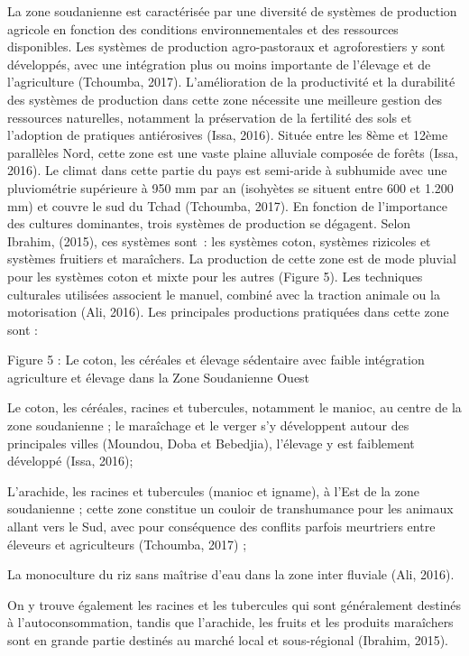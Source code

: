 \documentclass[12pt,oneside]{report}
\begin{document}
La zone soudanienne est caractérisée par une diversité de systèmes de production agricole en fonction des conditions environnementales et des ressources disponibles. Les systèmes de production agro-pastoraux et agroforestiers y sont développés, avec une intégration plus ou moins importante de l'élevage et de l'agriculture (Tchoumba, 2017). L'amélioration de la productivité et la durabilité des systèmes de production dans cette zone nécessite une meilleure gestion des ressources naturelles, notamment la préservation de la fertilité des sols et l'adoption de pratiques antiérosives (Issa, 2016). Située entre les 8ème et 12ème parallèles Nord, cette zone est une vaste plaine alluviale composée de forêts (Issa, 2016). Le climat dans cette partie du pays est semi-aride à subhumide avec une pluviométrie supérieure à 950 mm par an (isohyètes se situent entre 600 et 1.200 mm) et couvre le sud du Tchad (Tchoumba, 2017). En fonction de l’importance des cultures dominantes, trois systèmes de production se dégagent. Selon Ibrahim, (2015), ces systèmes sont : les systèmes coton, systèmes rizicoles et systèmes fruitiers et maraîchers. La production de cette zone est de mode pluvial pour les systèmes coton et mixte pour les autres (Figure 5). Les techniques culturales utilisées associent le manuel, combiné avec la traction animale ou la motorisation (Ali, 2016). Les principales productions pratiquées dans cette zone sont :

Figure 5 : Le coton, les céréales et élevage sédentaire avec faible intégration agriculture et élevage dans la Zone Soudanienne Ouest

Le coton, les céréales, racines et tubercules, notamment le manioc, au centre de la zone soudanienne ; le maraîchage et le verger s'y développent autour des principales villes (Moundou, Doba et Bebedjia), l'élevage y est faiblement développé (Issa, 2016);

L'arachide, les racines et tubercules (manioc et igname), à l'Est de la zone soudanienne ; cette zone constitue un couloir de transhumance pour les animaux allant vers le Sud, avec pour conséquence des conflits parfois meurtriers entre éleveurs et agriculteurs (Tchoumba, 2017) ;

La monoculture du riz sans maîtrise d'eau dans la zone inter fluviale (Ali, 2016).

On y trouve également les racines et les tubercules qui sont généralement destinés à l'autoconsommation, tandis que l'arachide, les fruits et les produits maraîchers sont en grande partie destinés au marché local et sous-régional (Ibrahim, 2015).
\end{document}
